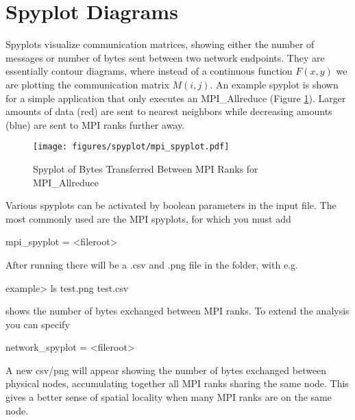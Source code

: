 

\section{Spyplot Diagrams}
\label{sec:tutorials:spyplot}

Spyplots visualize communication matrices, showing either the number of messages or number of bytes sent between two network endpoints.
They are essentially contour diagrams, where instead of a continuous function $F(x,y)$ we are plotting the communication matrix $M(i,j)$.
An example spyplot is shown for a simple application that only executes an MPI\_Allreduce (Figure \ref{fig:spyplot}).
Larger amounts of data (red) are sent to nearest neighbors while decreasing amounts (blue) are sent to MPI ranks further away.

\begin{figure}[h]
\centering
\texttt{[image: figures/spyplot/mpi\_spyplot.pdf]}
\caption{Spyplot of Bytes Transferred Between MPI Ranks for MPI\_Allreduce}
\label{fig:spyplot}
\end{figure}

Various spyplots can be activated by boolean parameters in the input file.
The most commonly used are the MPI spyplots, for which you must add

\begin{ViFile}
mpi_spyplot = <fileroot>
\end{ViFile}

After running there will be a .csv and .png file in the folder, with e.g. 

\begin{ShellCmd}
example> ls 
test.png
test.csv
\end{ShellCmd}
 shows the number of bytes exchanged between MPI ranks.
To extend the analysis you can specify

\begin{ViFile}
network_spyplot = <fileroot>
\end{ViFile}
A new csv/png will appear showing the number of bytes exchanged between physical nodes, 
accumulating together all MPI ranks sharing the same node.
This gives a better sense of spatial locality when many MPI ranks are on the same node.


